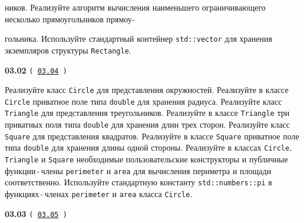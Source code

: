 \documentclass[a4paper,12pt]{article}
\begin{document}
ников. Реализуйте алгоритм вычисления наименьшего ограничивающего несколько прямоугольников прямоу-

гольника. Используйте стандартный контейнер \lstinline{std::vector} для хранения экземпляров структуры \lstinline{Rectangle}.

\bigskip

{\large \textbf{03.02} \texttt{(\,\href{https://github.com/i-s-m-mipt/Education/blob/master/projects/examples/source/03.04.cpp}{03.04}\,)}}

\bigskip

Реализуйте класс \lstinline{Circle} для представления окружностей. Реализуйте в классе \lstinline{Circle} приватное поле типа \lstinline{double} для хранения радиуса. Реализуйте класс \lstinline{Triangle} для представления треугольников. Реализуйте в классе \lstinline{Triangle} три приватных поля типа \lstinline{double} для хранения длин трех сторон. Реализуйте класс \lstinline{Square} для представления квадратов. Реализуйте в классе \lstinline{Square} приватное поле типа \lstinline{double} для хранения длины одной стороны. Реализуйте в классах \lstinline{Circle}, \lstinline{Triangle} и \lstinline{Square} необходимые пользовательские конструкторы и публичные функции\,-\,члены \lstinline{perimeter} и \lstinline{area} для вычисления периметра и площади соответственно. Используйте стандартную константу \lstinline{std::numbers::pi} в функциях\,-\,членах \lstinline{perimeter} и \lstinline{area} класса \lstinline{Circle}.

\bigskip

{\large \textbf{03.03} \texttt{(\,\href{https://github.com/i-s-m-mipt/Education/blob/master/projects/examples/source/03.05.cpp}{03.05}\,)}}

\bigskip
\end{document}
